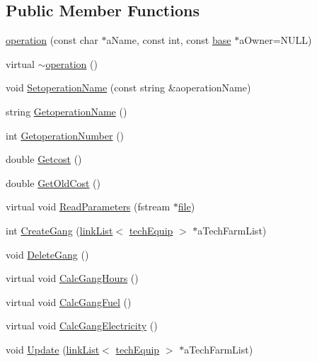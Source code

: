 \subsection*{Public Member Functions}
\begin{DoxyCompactItemize}
\item 
\hyperlink{classoperation_abc9c1aa7fb9f6b9afed39b2ca05db3ca}{operation} (const char $\ast$aName, const int, const \hyperlink{classbase}{base} $\ast$aOwner=NULL)
\item 
virtual \hyperlink{classoperation_ae41fe8b80fc92676e15e3ea25f09bea7}{$\sim$operation} ()
\item 
void \hyperlink{classoperation_a17112149ad62968d66e8beb3eaf22dee}{SetoperationName} (const string \&aoperationName)
\item 
string \hyperlink{classoperation_a55cc50507e466f2756681d2aaf7d93eb}{GetoperationName} ()
\item 
int \hyperlink{classoperation_a55c7762316a031a5be1dfc922548d2aa}{GetoperationNumber} ()
\item 
double \hyperlink{classoperation_ab1f5a26ae7907bdc4c093a99982aa8db}{Getcost} ()
\item 
double \hyperlink{classoperation_affa6a1e90c4e64ffc68b9a1d45fd26d4}{GetOldCost} ()
\item 
virtual void \hyperlink{classoperation_a239af45379b638fcb53c10873ef8bb16}{ReadParameters} (fstream $\ast$\hyperlink{classbase_a3af52ee9891719d09b8b19b42450b6f6}{file})
\item 
int \hyperlink{classoperation_a43f0d435816474a618d0167b56a575c4}{CreateGang} (\hyperlink{classlink_list}{linkList}$<$ \hyperlink{classtech_equip}{techEquip} $>$ $\ast$aTechFarmList)
\item 
void \hyperlink{classoperation_aee961be0d29d8cd2f78b94b813a26578}{DeleteGang} ()
\item 
virtual void \hyperlink{classoperation_a51c5612f29519bc82050ffccf089bc07}{CalcGangHours} ()
\item 
virtual void \hyperlink{classoperation_ab311cc421c3cc2a37dee5f2fc4e4c296}{CalcGangFuel} ()
\item 
virtual void \hyperlink{classoperation_a056348509e5e2da6c1cc03360a587df8}{CalcGangElectricity} ()
\item 
void \hyperlink{classoperation_af63de51c89b366f91ddd6b4597ff34e4}{Update} (\hyperlink{classlink_list}{linkList}$<$ \hyperlink{classtech_equip}{techEquip} $>$ $\ast$aTechFarmList)
\end{DoxyCompactItemize}

